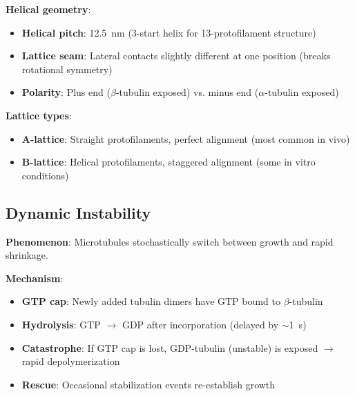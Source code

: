 \textbf{Helical geometry}:
\begin{itemize}
\item \textbf{Helical pitch}: 12.5~nm (3-start helix for 13-protofilament structure)
\item \textbf{Lattice seam}: Lateral contacts slightly different at one position (breaks rotational symmetry)
\item \textbf{Polarity}: Plus end ($\beta$-tubulin exposed) vs. minus end ($\alpha$-tubulin exposed)
\end{itemize}

\textbf{Lattice types}:
\begin{itemize}
\item \textbf{A-lattice}: Straight protofilaments, perfect alignment (most common in vivo)
\item \textbf{B-lattice}: Helical protofilaments, staggered alignment (some in vitro conditions)
\end{itemize}

\subsection{Dynamic Instability}
\label{subsec:dynamic-instability}

\textbf{Phenomenon}: Microtubules stochastically switch between growth and rapid shrinkage.

\textbf{Mechanism}:
\begin{itemize}
\item \textbf{GTP cap}: Newly added tubulin dimers have GTP bound to $\beta$-tubulin
\item \textbf{Hydrolysis}: GTP $\rightarrow$ GDP after incorporation (delayed by $\sim$1~s)
\item \textbf{Catastrophe}: If GTP cap is lost, GDP-tubulin (unstable) is exposed $\rightarrow$ rapid depolymerization
\item \textbf{Rescue}: Occasional stabilization events re-establish growth
\end{itemize}

